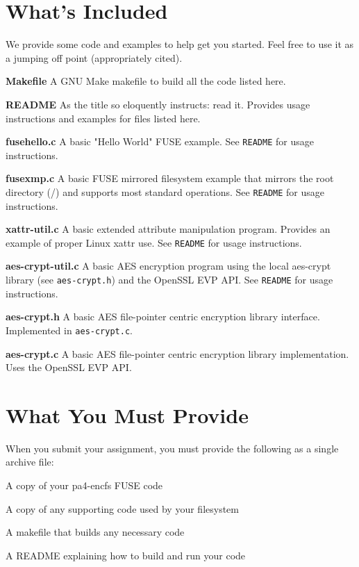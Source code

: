 \documentclass[12pt]{article}
\newenvironment{packed_enum}{
\begin{enumerate}
  \setlength{\itemsep}{1pt}
  \setlength{\parskip}{0pt}
  \setlength{\parsep}{0pt}
}{\end{enumerate}}
\newenvironment{packed_item}{
\begin{itemize}
  \setlength{\itemsep}{1pt}
  \setlength{\parskip}{0pt}
  \setlength{\parsep}{0pt}
}{\end{itemize}}
\begin{document}
\section{What's Included}

We provide some code and examples to help get you started.
Feel free to use it as a jumping off point (appropriately cited).

\begin{packed_item}
\item {\bf Makefile} A GNU Make makefile to build all the code listed
  here.
\item {\bf README} As the title so eloquently instructs: read
  it. Provides usage instructions and examples for files listed here.
\item {\bf fusehello.c} A basic "Hello World" FUSE example. See
  \texttt{README} for usage instructions.
\item {\bf fusexmp.c} A basic FUSE mirrored filesystem example that
  mirrors the root directory (/) and supports most standard
  operations. See \texttt{README} for usage instructions.
\item {\bf xattr-util.c} A basic extended attribute manipulation
  program. Provides an example of proper Linux xattr use.
  See \texttt{README} for usage instructions.
\item {\bf aes-crypt-util.c} A basic AES encryption program using the
  local aes-crypt library (see \texttt{aes-crypt.h}) and the OpenSSL EVP
  API\cite{openssl-evp}. See \texttt{README} for usage instructions.
\item {\bf aes-crypt.h} A basic AES file-pointer centric encryption
  library interface. Implemented in \texttt{aes-crypt.c}.
\item {\bf aes-crypt.c} A basic AES file-pointer centric encryption
  library implementation. Uses the OpenSSL EVP API\cite{openssl-evp}.
\end{packed_item}

\section{What You Must Provide}

When you submit your assignment, you must provide the following as a
single archive file:
\begin{packed_enum}
\item A copy of your pa4-encfs FUSE code
\item A copy of any supporting code used by your filesystem
\item A makefile that builds any necessary code
\item A README explaining how to build and run your code
\end{packed_enum}
\end{document}
